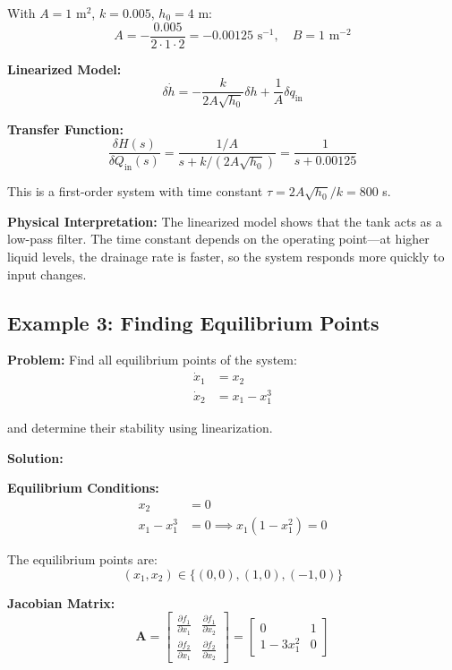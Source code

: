 \begin{examplebox}
With $A = 1$ m$^2$, $k = 0.005$, $h_0 = 4$ m:
\begin{equation}
A = -\frac{0.005}{2 \cdot 1 \cdot 2} = -0.00125 \text{ s}^{-1}, \quad B = 1 \text{ m}^{-2}
\end{equation}

\textbf{Linearized Model:}
\begin{equation}
\delta\dot{h} = -\frac{k}{2A\sqrt{h_0}}\delta h + \frac{1}{A}\delta q_{\text{in}}
\end{equation}

\textbf{Transfer Function:}
\begin{equation}
\frac{\delta H(s)}{\delta Q_{\text{in}}(s)} = \frac{1/A}{s + k/(2A\sqrt{h_0})} = \frac{1}{s + 0.00125}
\end{equation}

This is a first-order system with time constant $\tau = 2A\sqrt{h_0}/k = 800$ s.

\textbf{Physical Interpretation:} The linearized model shows that the tank acts as a low-pass filter. The time constant depends on the operating point---at higher liquid levels, the drainage rate is faster, so the system responds more quickly to input changes.
\end{examplebox}

\subsection{Example 3: Finding Equilibrium Points}

\textbf{Problem:} Find all equilibrium points of the system:
\begin{align}
\dot{x}_1 &= x_2 \\
\dot{x}_2 &= x_1 - x_1^3
\end{align}

and determine their stability using linearization.

\textbf{Solution:}

\textbf{Equilibrium Conditions:}
\begin{align}
x_2 &= 0 \\
x_1 - x_1^3 &= 0 \implies x_1(1 - x_1^2) = 0
\end{align}

The equilibrium points are:
\begin{equation}
(x_1, x_2) \in \{(0, 0), (1, 0), (-1, 0)\}
\end{equation}

\textbf{Jacobian Matrix:}
\begin{equation}
\mathbf{A} = \begin{bmatrix} \frac{\partial f_1}{\partial x_1} & \frac{\partial f_1}{\partial x_2} \\ \frac{\partial f_2}{\partial x_1} & \frac{\partial f_2}{\partial x_2} \end{bmatrix} = \begin{bmatrix} 0 & 1 \\ 1 - 3x_1^2 & 0 \end{bmatrix}
\end{equation}

